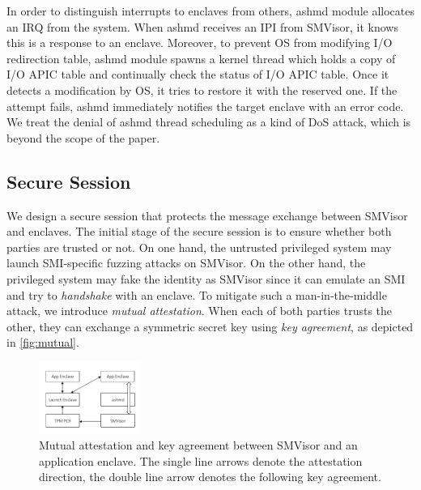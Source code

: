 In order to distinguish interrupts to enclaves from others, ashmd module allocates an IRQ from the system. When ashmd receives an IPI from  SMVisor, it knows this is a response to an enclave.
Moreover, to prevent OS from modifying I/O redirection table, ashmd module spawns a kernel thread which holds a copy of  I/O APIC table and continually check the status of I/O APIC  table. Once it detects a modification by OS, it tries to restore it with the reserved one. If the attempt fails, ashmd  immediately notifies the target enclave with an error code.  We treat the denial of ashmd thread scheduling as a kind of DoS attack, which is beyond the scope of the paper.

\subsection{Secure Session}\label{secure_session}

We design a secure session that protects the message exchange between SMVisor and enclaves. 
The initial stage of the secure session is to ensure whether both parties are trusted or not. On one hand, the untrusted privileged system may launch SMI-specific fuzzing attacks on  SMVisor. On the other hand, the privileged system may fake the identity as  SMVisor since it can emulate an SMI and try to \textit{handshake} with an enclave. To mitigate such a man-in-the-middle attack, we introduce \textit{mutual attestation}. When each of both parties trusts the other, they can exchange a symmetric secret key using \textit{key agreement}, as depicted in \autoref{fig:mutual}. %

\begin{figure}[t]
\centering
\includegraphics[width=0.3\textwidth]{figures/mutual.pdf}%
\caption{Mutual attestation and key agreement between SMVisor and an application enclave. The single line arrows denote the attestation direction, the double line arrow denotes the following key agreement.}
\label{fig:mutual}
\end{figure}

